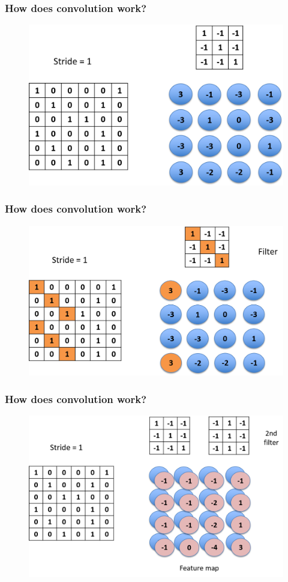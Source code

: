 \documentclass{beamer}
\begin{document}
\begin{frame}
	\frametitle{How does convolution work?}
	\begin{figure}
	\includegraphics[width=0.8\linewidth]{Picture2}
	\end{figure}
\end{frame}

\begin{frame}
	\frametitle{How does convolution work?}
	\begin{figure}
	\includegraphics[width=0.8\linewidth]{Picture3}
	\end{figure}
\end{frame}

\begin{frame}
	\frametitle{How does convolution work?}
	\begin{figure}
	\includegraphics[width=0.8\linewidth]{Picture4}
	\end{figure}
\end{frame}
\end{document}
